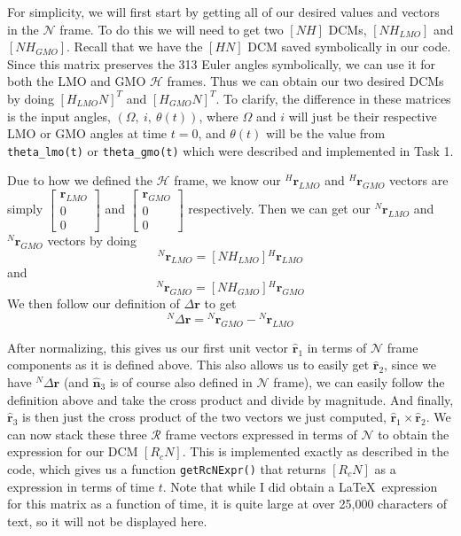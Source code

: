 \documentclass[conf]{new-aiaa}
\begin{document}
For simplicity, we will first start by getting all of our desired values and vectors in the $\mathcal{N}$ frame. To do this we will need to get two $[NH]$ DCMs, $[NH_{LMO}]$ and $[NH_{GMO}]$. Recall that we have the $[HN]$ DCM saved symbolically in our code. Since this matrix preserves the 313 Euler angles symbolically, we can use it for both the LMO and GMO $\mathcal{H}$ frames. Thus we can obtain our two desired DCMs by doing $[H_{LMO}N]^T$ and $[H_{GMO}N]^T$. To clarify, the difference in these matrices is the input angles, $(\Omega,\ i,\ \theta(t))$, where $\Omega$ and $i$ will just be their respective LMO or GMO angles at time $t=0$, and $\theta(t)$ will be the value from \texttt{theta\_lmo(t)} or \texttt{theta\_gmo(t)} which were described and implemented in Task 1.

Due to how we defined the $\mathcal{H}$ frame, we know our ${}^H\bm{r}_{LMO}$ and ${}^H\bm{r}_{GMO}$ vectors are simply $\begin{bmatrix}\bm{r}_{LMO} \\ 0 \\ 0\end{bmatrix}$ and $\begin{bmatrix}\bm{r}_{GMO} \\ 0 \\ 0\end{bmatrix}$ respectively. Then we can get our ${}^N\bm{r}_{LMO}$ and ${}^N\bm{r}_{GMO}$ vectors by doing 
\[{}^N\bm{r}_{LMO} = [NH_{LMO}]{}^H\bm{r}_{LMO}\] and 
\[{}^N\bm{r}_{GMO}=[NH_{GMO}]{}^H\bm{r}_{GMO}\]
We then follow our definition of $\Delta\bm{r}$ to get 
\[{}^N\Delta \bm{r} = {}^N\bm{r}_{GMO} - {}^N\bm{r}_{LMO}\]

After normalizing, this gives us our first unit vector $\hat{\bm{r}}_1$ in terms of $\mathcal{N}$ frame components as it is defined above. This also allows us to easily get $\hat{\bm{r}}_2$, since we have ${}^N\Delta \bm{r}$ (and $\hat{\bm{n}}_3$ is of course also defined in $\mathcal{N}$ frame), we can easily follow the definition above and take the cross product and divide by magnitude. And finally, $\hat{\bm{r}}_3$ is then just the cross product of the two vectors we just computed, $\hat{\bm{r}}_1\times\hat{\bm{r}}_2$. We can now stack these three $\mathcal{R}$ frame vectors expressed in terms of $\mathcal{N}$ to obtain the expression for our DCM $[R_cN]$. This is implemented exactly as described in the code, which gives us a function \texttt{getRcNExpr()} that returns $[R_cN]$ as a expression in terms of time $t$. Note that while I did obtain a \LaTeX\ expression for this matrix as a function of time, it is quite large at over 25,000 characters of text, so it will not be displayed here. 
\end{document}
